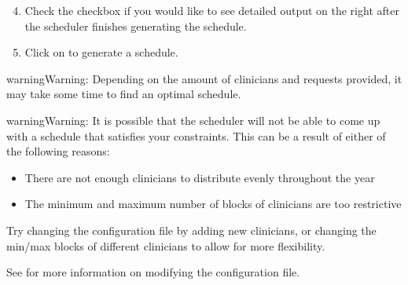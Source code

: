 \documentclass[letterpaper,10pt,english]{sphinxmanual}
\begin{document}
\begin{figure}[H]
\centering
{}\end{figure}
\begin{enumerate}
\setcounter{enumi}{3}
\item {} 
 Check the  checkbox if you would like
to see detailed output on the right after the scheduler finishes generating
the schedule.

\end{enumerate}

\begin{figure}[H]
\centering
{}\end{figure}
\begin{enumerate}
\setcounter{enumi}{4}
\item {} 
Click on  to generate a schedule.

\end{enumerate}

\begin{sphinxadmonition}{warning}{Warning:}
Depending on the amount of clinicians and requests provided, it may take
some time to find an optimal schedule.
\end{sphinxadmonition}

\begin{figure}[H]
\centering
{}\end{figure}

\begin{sphinxadmonition}{warning}{Warning:}
It is possible that the scheduler will not be able to come up with a
schedule that satisfies your constraints. This can be a result of either
of the following reasons:
\begin{itemize}
\item {} 
There are not enough clinicians to distribute evenly throughout the year

\item {} 
The minimum and maximum number of blocks of clinicians are too restrictive

\end{itemize}

Try changing the configuration file by adding new clinicians, or changing
the min/max blocks of different clinicians to allow for more flexibility.

See {\hyperref[\detokenize{manual:clinician-configuration}]{}} for more information on modifying the configuration file.
\end{sphinxadmonition}
\end{document}
